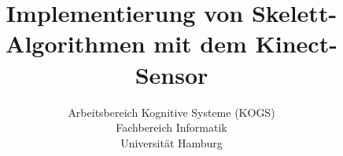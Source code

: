 %
%
\title{Implementierung von Skelett-Algorithmen mit dem Kinect-Sensor}
\author{Arbeitsbereich Kognitive Systeme (KOGS)\\ Fachbereich Informatik\\ Universität Hamburg}
\publishers{Projektbarbeit\\ Projekt Bildverarbeitung \\Johannes Böhler, Christopher Kroll, Sandra Schröder\\  \vspace{2 cm} Sommersemester 2012 bis Wintersemester 2012/2013}
\lowertitleback{}
\date{}
%
% 
% 
% 
% 
% 
% 
